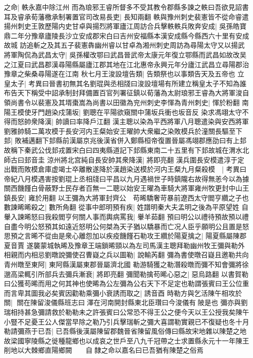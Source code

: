 之命|{
	軼永嘉中除江州}
而為琅邪王睿所督多不受其教令郡縣多諫之軼曰吾欲見詔書耳及睿承荀藩檄承制署置官司改易長吏|{
	長知兩翻}
軼與豫州刺史裴憲皆不從命睿遣揚州刺史王敦歷陽内史甘卓與揚烈將軍廬江周訪合兵擊軼軼兵敗奔安成|{
	吳孫皓寶鼎二年分豫章廬陵長沙立安成郡宋白曰吉州安福縣本漢安成縣今縣西六十里有安成故城}
訪追斬之及其五子裴憲犇幽州睿以甘卓為湘州刺史周訪為尋陽太守又以揚武將軍陶侃為武昌太守|{
	吳孫權改鄂曰武昌晉武帝太康元年復立鄂縣而武昌如故改吴之江夏曰武昌郡漢尋陽縣屬廬江郡其地在江北惠帝永興元年分廬江武昌立尋陽郡治豫章之柴桑尋陽遂在江南}
秋七月王浚設壇告類|{
	告類祭也以事類告天及五帝也}
立皇太子|{
	考異曰晉書初無其名劉琨與丞相牋曰浚設壇場有所建立稱皇太子不知為誰}
布告天下稱受中詔承制封拜備置百官列署征鎮以荀藩為太尉琅邪王睿為大將軍浚自領尚書令以裴憲及其壻棗嵩為尚書以田徽為兖州刺史李惲為青州刺史|{
	惲於粉翻}
南陽王模使牙門趙染戍蒲坂|{
	劉聰在平陽欲窺關中蒲坂兵衝也坂音反}
染求馮翊太守不得而怒帥衆降漢|{
	帥讀曰率降戶江翻}
漢主聰以染為平西將軍八月聰遣染與安西將軍劉雅帥騎二萬攻模于長安河内王粲始安王曜帥大衆繼之染敗模兵於潼關長驅至下邽|{
	敗補邁翻下邽縣前漢屬京兆後漢省併入鄭縣桓帝復置晉屬馮翊郡應劭曰有上邽故稱下秦武公伐邽戎置宋白曰四夷縣道記下邽縣東南二十五里有下邽故城在渭水北師古曰邽音圭}
涼州將北宫純自長安帥其衆降漢|{
	將即亮翻}
漢兵圍長安模遣淳于定出戰而敗模倉庫虚竭士卒離散遂降於漢趙染送模於河内王粲九月粲殺模　|{
	考異曰帝紀八月模遇害按劉琨上丞相牋曰平昌以九月遇禍世子時鎮隴右故得無恙今以為據}
關西饑饉白骨蔽野士民存者百無一二聰以始安王曜為車騎大將軍雍州牧更封中山王鎮長安|{
	雍於用翻}
以王彌為大將軍封齊公　苟晞驕奢苛暴前遼西太守閻亨纘之子也數諫晞晞殺之|{
	數所角翻}
從事中郎明預有疾|{
	姓譜明秦大夫孟明之後為平原望姓}
自轝入諫晞怒曰我殺閻亨何關人事而輿病罵我|{
	轝羊茹翻}
預曰明公以禮待預故預以禮自盡今明公怒預其如遠近怒明公何桀為天子猶以驕暴而亡况人臣乎願明公且置是怒思預之言晞不從由是衆心離怨加以疾疫饑饉石勒攻王纘於陽夏擒之|{
	陽夏縣屬陳郡夏音賈}
遂襲蒙城執晞及豫章王端鎖晞頸以為左司馬漢主聰拜勒幽州牧王彌與勒外相親而内相忌劉暾說彌使召曹嶷之兵以圖勒|{
	說輸芮翻}
彌為書使暾召嶷且邀勒共向青州暾至東阿|{
	東阿縣漢屬東郡晉屬濟北國}
勒游騎獲之勒潛殺暾而彌不知會彌將徐邈高梁輒引所部兵去彌兵漸衰|{
	將即亮翻}
彌聞勒擒苟晞心惡之|{
	惡烏路翻}
以書賀勒曰公獲苟晞而用之何其神也使晞為公左彌為公右天下不足定也勒謂張賓曰王公位重而言卑其圖我必矣賓因勸勒乘彌小衰誘而取之|{
	誘音酉}
時勒方與乞活陳午相攻於關|{
	關在陳留浚儀縣班志曰澤在河南開封縣東北臣瓚曰今浚儀有陂是也}
彌亦與劉瑞相持甚急彌請救於勒勒未之許張賓曰公常恐不得王公之便今天以王公授我矣陳午小豎不足憂王公人傑當早除之勒乃引兵擊瑞斬之彌大喜謂勒實親已不復疑也冬十月勒請彌燕于已吾|{
	已吾縣後漢屬陳留郡魏晉省陳留風俗傳曰縣故宋地雜以陳楚之地故梁國寧陵縣之徙種龍鄉也以成哀之世戶至八九千冠帶之士求置縣永元十一年陳王削地以大棘鄉直陽鄉闕　　自隸之命以嘉名曰已吾猶有陳楚之俗焉}
